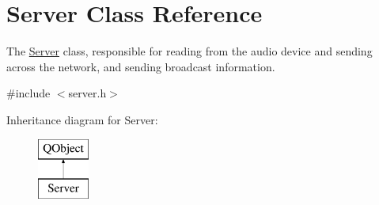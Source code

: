 \hypertarget{class_server}{\section{Server Class Reference}
\label{class_server}
}


The \hyperlink{class_server}{Server} class, responsible for reading from the audio device and sending across the network, and sending broadcast information.  




{\ttfamily \#include $<$server.\+h$>$}

Inheritance diagram for Server\+:\begin{figure}[H]
\begin{center}
\leavevmode
\includegraphics[height=2.000000cm]{class_server}
\end{center}
\end{figure}
